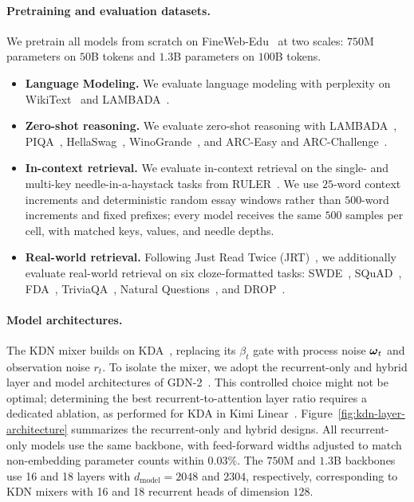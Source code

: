 \documentclass{article} %
\begin{document}
\paragraph{Pretraining and evaluation datasets.}
We pretrain all models from scratch on FineWeb-Edu~\citep{penedo2024fineweb} at two scales:
$750$M parameters on $50$B tokens and $1.3$B parameters on $100$B tokens.
\begin{itemize}
\item \textbf{Language Modeling.} We evaluate language
modeling with perplexity on WikiText~\citep{merity2017pointer} and
LAMBADA~\citep{paperno2016lambada}.
\item \textbf{Zero-shot reasoning.} We evaluate zero-shot reasoning with
LAMBADA~\citep{paperno2016lambada}, PIQA~\citep{bisk2020piqa},
HellaSwag~\citep{zellers2019hellaswag}, WinoGrande~\citep{sakaguchi2020winogrande}, and
ARC-Easy and ARC-Challenge~\citep{clark2018arc}.
\item \textbf{In-context retrieval.} We evaluate
in-context retrieval on the single- and multi-key needle-in-a-haystack tasks from
RULER~\citep{hsieh2024ruler}. We use $25$-word context increments and deterministic random essay
windows rather than $500$-word increments and fixed prefixes; every model receives the same $500$
samples per cell, with matched keys, values, and needle depths.
\item \textbf{Real-world retrieval.} Following Just Read Twice (JRT)~\citep{arora2024justreadtwice},
we additionally evaluate real-world retrieval on six cloze-formatted tasks: SWDE~\citep{lockard2019openceres},
SQuAD~\citep{rajpurkar2018squad}, FDA~\citep{arora2023evaporate},
TriviaQA~\citep{joshi2017triviaqa}, Natural Questions~\citep{kwiatkowski2019natural}, and
DROP~\citep{dua2019drop}.
\end{itemize}

\paragraph{Model architectures.}
The KDN mixer builds on KDA~\citep{kimiteam2025kimilinear}, replacing its $\beta_t$ gate with
process noise $\boldsymbol{\omega}_t$ and observation noise $r_t$. To isolate the mixer, we adopt the
recurrent-only and hybrid layer and model architectures of GDN-2~\citep{hatamizadeh2026gdn2}.
This controlled choice might not be optimal; determining the best recurrent-to-attention layer
ratio requires a dedicated ablation, as performed for KDA in Kimi
Linear~\citep{kimiteam2025kimilinear}.
Figure~\ref{fig:kdn-layer-architecture} summarizes the recurrent-only and hybrid designs. All
recurrent-only models use the same backbone, with feed-forward widths adjusted to match non-embedding
parameter counts within $0.03\%$. The $750$M
and $1.3$B backbones use 16 and 18 layers with $d_{\mathrm{model}}=2048$ and $2304$, respectively,
corresponding to KDN mixers with 16 and 18 recurrent heads of dimension $128$.
\end{document}
